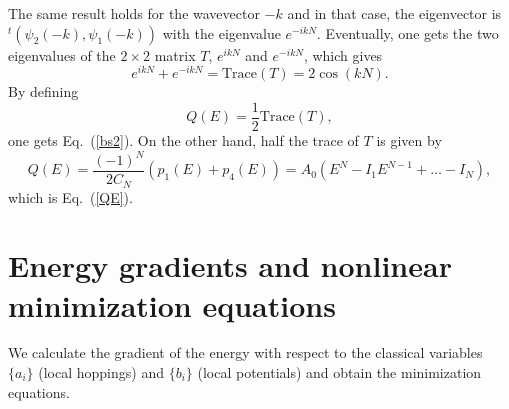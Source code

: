 \documentclass[]{revtex4-1}
\begin{document}
The same result holds for the wavevector $-k$ and in that case, the eigenvector is $^t\left(\psi_{2}(-k),\psi_{1}(-k)\right)$ with the eigenvalue $e^{-ikN}$. Eventually, one gets the two eigenvalues of the $2 \times 2$ matrix $T$,  $e^{ikN}$ and $e^{-ikN}$, which gives
\begin{equation}
e^{ikN}+e^{-ikN}= \text{Trace}(T)=2 \cos(kN).
\end{equation}
By defining \begin{equation} Q(E) = \frac{1}{2} \text{Trace} (T), \end{equation}
one gets Eq.~(\ref{bs2}). On the other hand, half the trace of $T$ is given by  \begin{equation} Q(E) = \frac{(-1)^N}{2C_N} (p_1(E)+p_4(E))= A_0 (E^N-I_1E^{N-1}+\dots-I_N), \end{equation} which is Eq.~(\ref{QE}).


 \section{Energy gradients and nonlinear minimization equations}
 \label{appB}

We calculate the gradient of the energy with respect to the classical variables $\{a_i\}$ (local hoppings) and $\{b_i\}$ (local potentials) and obtain the minimization equations.
 
\end{document}
